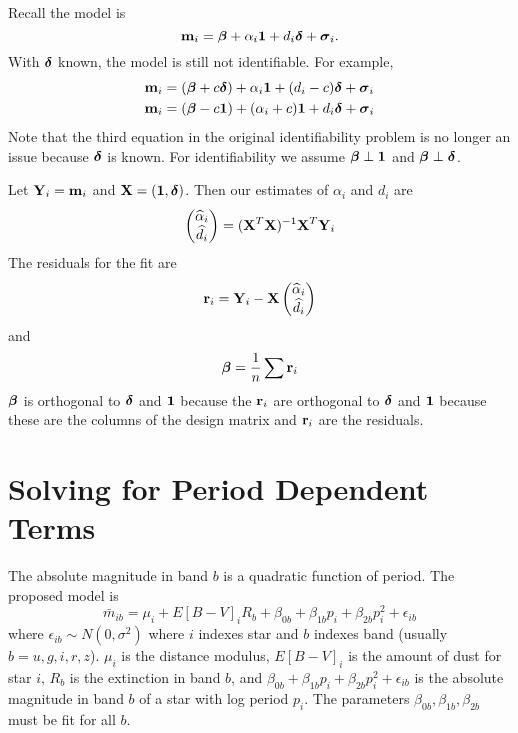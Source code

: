 \documentclass[12pt]{article}
\newcommand{\V}[1]{{\bm{\mathbf{\MakeLowercase{#1}}}}} %
\newcommand{\M}[1]{{\bm{\mathbf{\MakeUppercase{#1}}}}} %
\begin{document}
%
%
Recall the model is
\begin{equation*}
\V{m}_i = \V{\beta} + \alpha_i \V{1} + d_i \V{\delta} + \V{\sigma}_i.
\end{equation*}
With $\V{\delta}$ known, the model is still not identifiable. For example,
\begin{align*}
\V{m}_i &= (\V{\beta} + c\V{\delta}) + \alpha_i \V{1} + (d_i - c) \V{\delta} + \V{\sigma}_i\\
\V{m}_i &= (\V{\beta} - c\V{1}) + (\alpha_i + c)\V{1} + d_i\V{\delta} + \V{\sigma}_i\\
\end{align*}
Note that the third equation in the original identifiability problem is no longer an issue because $\V{\delta}$ is known. For identifiability we assume $\V{\beta} \perp \V{1}$ and $\V{\beta} \perp \V{\delta}$.

Let $\M{Y}_i=\V{m}_i$ and $\M{X} = (\V{1},\V{\delta})$. Then our estimates of $\alpha_i$ and $d_i$ are
\begin{equation*}
\begin{pmatrix}
\widehat{\alpha}_i \\\widehat{d}_i
\end{pmatrix}
 = (\M{X}^T\M{X})^{-1}\M{X}^T\M{Y}_i
\end{equation*}
The residuals for the fit are
\begin{equation*}
\V{r}_i = \M{Y}_i - \M{X}\begin{pmatrix}
\widehat{\alpha}_i \\\widehat{d}_i
\end{pmatrix}
\end{equation*}
and 
\begin{equation*}
\V{\beta} = \frac{1}{n}\sum \V{r}_i
\end{equation*}
$\V{\beta}$ is orthogonal to $\V{\delta}$ and $\V{1}$ because the $\V{r}_i$ are orthogonal to $\V{\delta}$ and $\V{1}$ because these are the columns of the design matrix and $\V{r}_i$ are the residuals.

\section{Solving for Period Dependent Terms}

The absolute magnitude in band $b$ is a quadratic function of period. The proposed model is
\begin{equation*}
\bar{m}_{ib} = \mu_i + E[B-V]_iR_b + \beta_{0b} + \beta_{1b}p_i + \beta_{2b}p_i^2  + \epsilon_{ib}
\end{equation*}
where $\epsilon_{ib} \sim N(0,\sigma^2)$ where $i$ indexes star and $b$ indexes band (usually $b=u,g,i,r,z$). $\mu_i$ is the distance modulus, $E[B-V]_i$ is the amount of dust for star $i$, $R_b$ is the extinction in band $b$, and $\beta_{0b} + \beta_{1b}p_i + \beta_{2b}p_i^2  + \epsilon_{ib}$ is the absolute magnitude in band $b$ of a star with log period $p_i$. The parameters $\beta_{0b},\beta_{1b},\beta_{2b}$ must be fit for all $b$.
\end{document}
